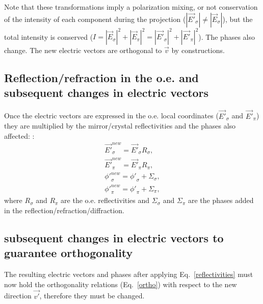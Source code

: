 \documentclass{iucr}
\begin{document}
Note that these transformations imply a polarization mixing, or not conservation of the intensity of each component during the projection ($|\vec{E'}_\sigma| \ne |\vec{E}_\sigma|$),
but the total intensity is conserved ($I=|\vec{E}_\sigma|^2+|\vec{E}_\pi|^2=
|\vec{E'}_\sigma|^2+|\vec{E'}_\pi|^2$). The phases also change.
The new electric vectors are orthogonal to $\vec{v}$ by constructions.

\subsection{Reflection/refraction in the o.e. and subsequent changes in electric vectors}
\label{sec:reflection}

Once the electric vectors are expressed in the o.e. local coordinates ($\vec{E'}_\sigma$ and 
$\vec{E'}_\pi$) they are multiplied by the mirror/crystal reflectivities and the phases also affected: : 
\begin{eqnarray}
 \label{reflectivities}
 \vec{E'}_\sigma^{new} = \vec{E'}_\sigma R_\sigma, \nonumber \\
 \vec{E'}_\pi^{new} = \vec{E'}_\pi R_\pi, \nonumber \\
 {\phi '}_\sigma^{new} = {\phi '}_\sigma + \Sigma_\sigma, \nonumber \\
 {\phi '}_\pi^{new} = {\phi '}_\pi + \Sigma_\pi,
\end{eqnarray}
where $R_\sigma$ and $R_\pi$ are the o.e. reflectivities and $\Sigma_\sigma$ and $\Sigma_\pi$ are the  phases added in the reflection/refraction/diffraction. 

\subsection{subsequent changes in electric vectors to guarantee orthogonality}
\label{sec:orthogonality}

The resulting electric vectors and phases after applying Eq.~\ref{reflectivities} must now hold the orthogonality relations (Eq.~\ref{ortho}) with respect to the new direction $\vec{v'}$, therefore they must be changed. 
\end{document}
